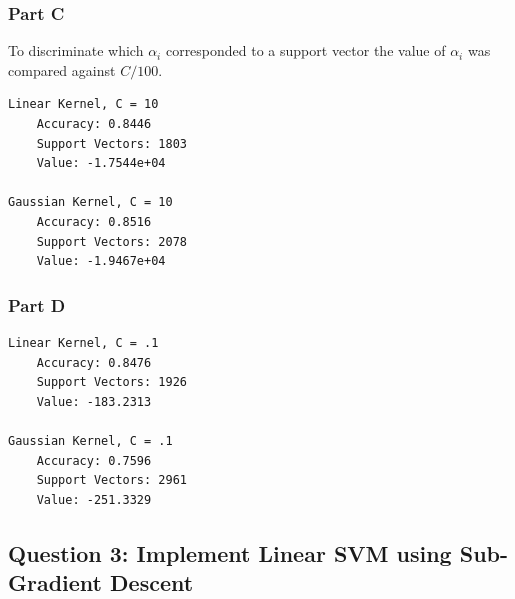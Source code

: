 \documentclass[11pt, oneside]{article}   	%
\begin{document}
\subsubsection{Part C}
To discriminate which $\alpha_i$ corresponded to a support vector the value of $\alpha_i$ was compared against $C/100$.
\begin{verbatim}
Linear Kernel, C = 10
    Accuracy: 0.8446
    Support Vectors: 1803
    Value: -1.7544e+04

Gaussian Kernel, C = 10
    Accuracy: 0.8516
    Support Vectors: 2078
    Value: -1.9467e+04
\end{verbatim}

\subsubsection{Part D}
\begin{verbatim}
Linear Kernel, C = .1
    Accuracy: 0.8476
    Support Vectors: 1926
    Value: -183.2313
    
Gaussian Kernel, C = .1
    Accuracy: 0.7596
    Support Vectors: 2961
    Value: -251.3329
\end{verbatim}

\newpage{}
\subsection{Question 3: Implement Linear SVM using Sub-Gradient Descent}
\end{document}
